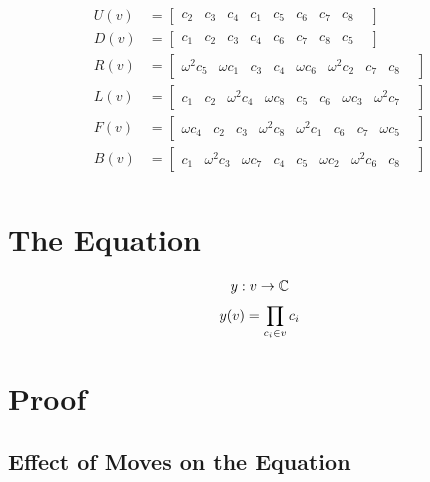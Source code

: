 \documentclass{article}
\begin{document}
\begin{align*}
U(v)&=
\begin{bmatrix}
c_2 &
c_3 &
c_4 &
c_1 &
c_5 &
c_6 &
c_7 &
c_8 &
\end{bmatrix}\\
D(v)&=
\begin{bmatrix}
c_1 &
c_2 &
c_3 &
c_4 &
c_6 &
c_7 &
c_8 &
c_5 &
\end{bmatrix}\\
R(v)&=
\begin{bmatrix}
\omega^2  c_5 &
\omega c_1 &
c_3 &
c_4 &
\omega c_6 &
\omega^2 c_2 &
c_7 &
c_8 &
\end{bmatrix}\\
L(v)&=
\begin{bmatrix}
c_1 &
c_2 &
\omega^2 c_4 &
\omega c_8 &
c_5 &
c_6 &
\omega c_3 &
\omega^2 c_7 &
\end{bmatrix}\\
F(v)&=
\begin{bmatrix}
\omega c_4 &
c_2 &
c_3 &
\omega^2 c_8 &
\omega^2 c_1 &
c_6 &
c_7 &
\omega c_5 &
\end{bmatrix}\\
B(v)&=
\begin{bmatrix}
c_1 &
\omega^2 c_3 &
\omega c_7&
c_4 &
c_5 &
\omega c_2 &
\omega^2 c_6&
c_8 &
\end{bmatrix}\\
\end{align*}



\section{The Equation}

\begin{align*}
y:v \rightarrow \mathbb{C}
 \vspace{2mm}
\end{align*}
\begin{equation}
\large
y(v) = \prod_{c_i \in v} c_i
\end{equation}


\newpage
\section{Proof}
\subsection{Effect of Moves on the Equation}
\end{document}
